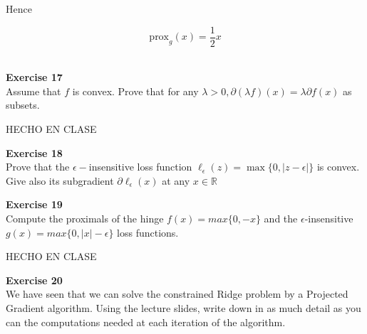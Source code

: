 \documentclass[11pt,table]{article}
\newenvironment{problem}[2][Exercise]
    { \begin{mdframed}[backgroundcolor=gray!20] \textbf{#1 #2} \\}
    {  \end{mdframed}}
\newcommand\abs[1]{\lvert#1\rvert}
\newcommand\R{\mathbb R}
\begin{document}
Hence

\[
\text{prox}_g(x) =  \frac{1}{2} x
\] \\

\begin{problem}{17}
Assume that \( f \)  is convex. Prove that for any \( \lambda > 0, \partial(\lambda f)(x) = \lambda \partial f(x) \) as subsets.
\end{problem}

HECHO EN CLASE \\

\begin{problem}{18}
Prove that the \(\epsilon-\)insensitive loss function \(\ell_\epsilon(z) = \max\{0,\abs{z - \epsilon}\}\) is convex. Give also its subgradient \(\partial \ell_\epsilon(x)\) at any \(x \in \R\)
\end{problem}



\begin{problem}{19}
Compute the proximals of the hinge \( f(x) = max\{0, -x\}  \) and the \( \epsilon \)-insensitive \( g(x)=max\{0, |x| - \epsilon\} \) loss functions.
\end{problem}

HECHO EN CLASE\\

\begin{problem}{20}
We have seen that we can solve the constrained Ridge problem by a Projected Gradient algorithm. Using the lecture slides, write down in as much detail as you can the computations needed at each iteration of the algorithm.
\end{problem}
\end{document}
